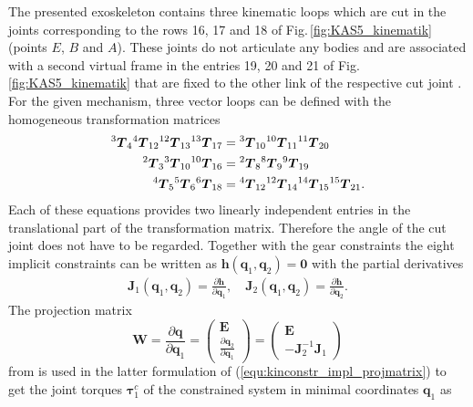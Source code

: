 \documentclass{svproc}
\newcommand{\bm}[1]{\boldsymbol{#1}}
\renewcommand{\vec}[1]{\mbox{\boldmath{$#1$}}}
\newcommand{\tmat}[2]{{^{\mathrm{#1}}\vec{T}_{\mathrm{#2}}}}
\begin{document}
The presented exoskeleton contains three kinematic loops which are cut in the joints corresponding to the rows 16, 17 and 18 of Fig.\,\ref{fig:KAS5_kinematik} (points $E$, $B$ and $A$).
These joints do not articulate any bodies and are associated with a second virtual frame in the entries 19, 20 and 21 of Fig.\,\ref{fig:KAS5_kinematik} that are fixed to the other link of the respective cut joint \cite{KhalilBen1995,SaminFis2013}.
For the given mechanism, three vector loops can be defined with the homogeneous transformation matrices
%
\begin{align}
\tmat{3}{4} \tmat{4}{12} \tmat{12}{13} \tmat{13}{17} &= \tmat{3}{10} \tmat{10}{11} \tmat{11}{20} \label{equ:implconstr_chain1} \\
\tmat{2}{3} \tmat{3}{10} \tmat{10}{16}  &= \tmat{2}{8} \tmat{8}{9} \tmat{9}{19} \label{equ:implconstr_chain2} \\
\tmat{4}{5} \tmat{5}{6} \tmat{6}{18}  &= \tmat{4}{12} \tmat{12}{14} \tmat{14}{15} \tmat{15}{21}.
\label{equ:implconstr_chain3}
\end{align}
%
Each of these equations provides two linearly independent entries in the translational part of the transformation matrix.
Therefore the angle of the cut joint does not have to be regarded.
Together with the gear constraints the eight implicit constraints can be written as
%
$
\bm{h}(\bm{q}_1, \bm{q}_2) = \bm{0}
$
%
with the partial derivatives
%
\vspace{-0.3cm}
\begin{align}
\bm{J}_1(\bm{q}_1, \bm{q}_2)=\frac{\partial\bm{h}}{\partial \bm{q}_1}, \quad 
\bm{J}_2(\bm{q}_1, \bm{q}_2)=\frac{\partial\bm{h}}{\partial \bm{q}_2}. \label{equ:kinconstr_impl_grad}
\end{align}
%
The projection matrix
\vspace{-0.3cm}
%
\begin{equation}
\bm{W} = \frac{\partial \bm{q}}{\partial \bm{q}_1} 
= \begin{pmatrix} \bm{E}\\ \frac{\partial \bm{q}_2}{\partial \bm{q}_1} \end{pmatrix}
= \begin{pmatrix} \bm{E}\\ -\bm{J}_2^{-1}\bm{J}_1 \end{pmatrix}
\label{equ:kinconstr_impl_projmatrix}
\end{equation}
%
from \cite{NakamuraGho1989,ParkChoPlo1999} is used in the latter formulation of (\ref{equ:kinconstr_impl_projmatrix}) to get the joint torques $\bm{\tau}^c_1$ of the constrained system in minimal coordinates $\bm{q}_1$ as
\end{document}
